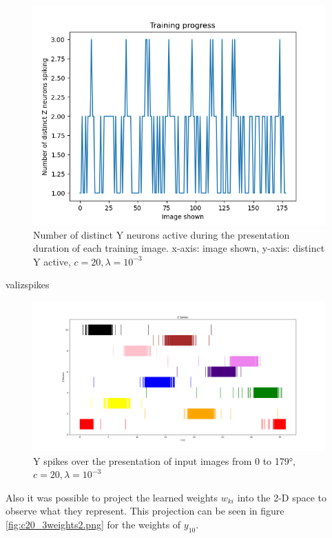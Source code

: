 \begin{figure}
  \includegraphics[width=\linewidth]{figures/angleNetwork/c20_3validationDistinctZSpikes.png}
  \caption{Number of distinct Y neurons active during the presentation duration of each training image. x-axis: image shown, y-axis: distinct Y active, $c = 20, \lambda = 10^{-3}$}
  \label{fig:c20_3validationDistinctZSpikes}
\end{figure}

valizspikes

\begin{figure}
  \includegraphics[width=\linewidth]{figures/angleNetwork/c20_3validationZSpikes.png}
  \caption{Y spikes over the presentation of input images from 0 to 179°, $c = 20, \lambda = 10^{-3}$}
  \label{fig:c20_3validationZSpikes}
\end{figure}

Also it was possible to project the learned weights $w_{ki}$ into the 2-D space to observe what they represent. This projection can be seen in figure \ref{fig:c20_3weights2.png} for the weights of $y_10$.

